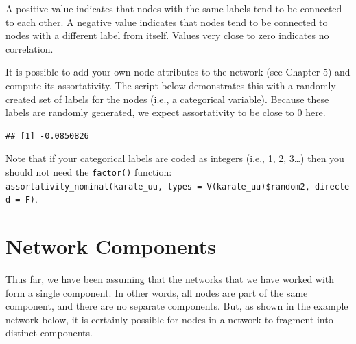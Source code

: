 \documentclass[
]{book}
\newenvironment{Shaded}{\begin{snugshade}}{\end{snugshade}}
\newcommand{\AttributeTok}[1]{\textcolor[rgb]{0.13,0.29,0.53}{#1}}
\newcommand{\CommentTok}[1]{\textcolor[rgb]{0.56,0.35,0.01}{\textit{#1}}}
\newcommand{\DecValTok}[1]{\textcolor[rgb]{0.00,0.00,0.81}{#1}}
\newcommand{\FunctionTok}[1]{\textcolor[rgb]{0.13,0.29,0.53}{\textbf{#1}}}
\newcommand{\NormalTok}[1]{#1}
\newcommand{\OtherTok}[1]{\textcolor[rgb]{0.56,0.35,0.01}{#1}}
\newcommand{\SpecialCharTok}[1]{\textcolor[rgb]{0.81,0.36,0.00}{\textbf{#1}}}
\newcommand{\StringTok}[1]{\textcolor[rgb]{0.31,0.60,0.02}{#1}}
\begin{document}
A positive value indicates that nodes with the same labels tend to be connected to each other. A negative value indicates that nodes tend to be connected to nodes with a different label from itself. Values very close to zero indicates no correlation.

It is possible to add your own node attributes to the network (see Chapter 5) and compute its assortativity. The script below demonstrates this with a randomly created set of labels for the nodes (i.e., a categorical variable). Because these labels are randomly generated, we expect assortativity to be close to 0 here.

\begin{Shaded}
\end{Shaded}

\begin{verbatim}
## [1] -0.0850826
\end{verbatim}

Note that if your categorical labels are coded as integers (i.e., 1, 2, 3\ldots) then you should not need the \texttt{factor()} function: \texttt{assortativity\_nominal(karate\_uu,\ types\ =\ V(karate\_uu)\$random2,\ directed\ =\ F)}.

\section{Network Components}\label{network-components}

Thus far, we have been assuming that the networks that we have worked with form a single component. In other words, all nodes are part of the same component, and there are no separate components. But, as shown in the example network below, it is certainly possible for nodes in a network to fragment into distinct components.
\end{document}
